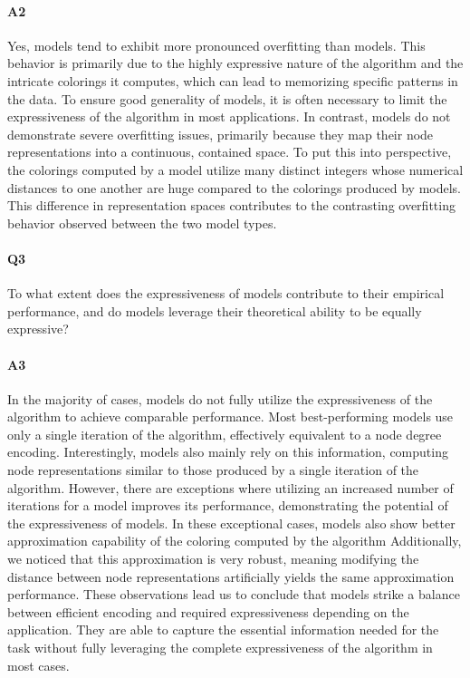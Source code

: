 \paragraph{A2} Yes, \textsf{\wlnn} models tend to exhibit more pronounced overfitting than \textsf{\gnn} models. This behavior is primarily due to the highly expressive nature of the \wl algorithm and the intricate colorings it computes, which can lead to memorizing specific patterns in the data. To ensure good generality of \wlnn models, it is often necessary to limit the expressiveness of the \wl algorithm in most applications. In contrast, \gnn models do not demonstrate severe overfitting issues, primarily because they map their node representations into a continuous, contained space. To put this into perspective, the colorings computed by a \wlnn model utilize many distinct integers whose numerical distances to one another are huge compared to the colorings produced by \gnn models. This difference in representation spaces contributes to the contrasting overfitting behavior observed between the two model types.\bigskip

\paragraph{Q3} To what extent does the expressiveness of \wlnn models contribute to their empirical performance, and do \gnn models leverage their theoretical ability to be equally expressive?

\vspace{-15pt}

\paragraph{A3} In the majority of cases, \wlnn models do not fully utilize the expressiveness of the \wl algorithm to achieve comparable performance. Most best-performing \wlnn models use only a single iteration of the \wl algorithm, effectively equivalent to a node degree encoding. Interestingly, \gnn models also mainly rely on this information, computing node representations similar to those produced by a single iteration of the \wl algorithm. However, there are exceptions where utilizing an increased number of \wl iterations for a \wlnn model improves its performance, demonstrating the potential of the expressiveness of \wlnn models. In these exceptional cases, \gnn models also show better approximation capability of the coloring computed by the \wl algorithm Additionally, we noticed that this approximation is very robust, meaning modifying the distance between node representations artificially yields the same approximation performance. These observations lead us to conclude that \gnn models strike a balance between efficient encoding and required expressiveness depending on the application. They are able to capture the essential information needed for the task without fully leveraging the complete expressiveness of the \wl algorithm in most cases.\bigskip

